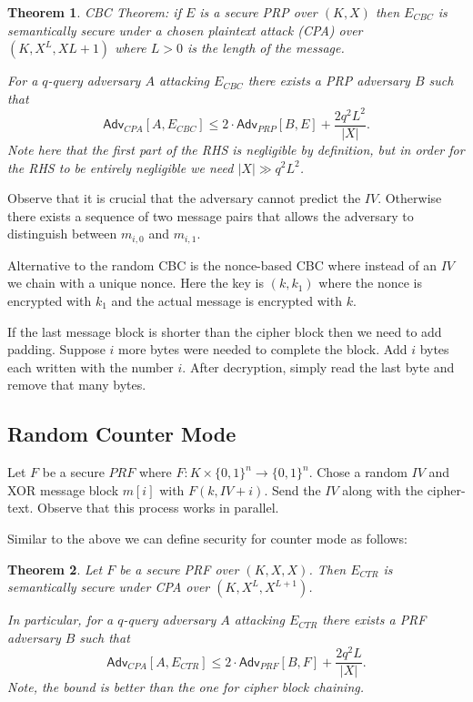 \documentclass[twoside]{article}
\newcounter{lecnum}
\newtheorem{theorem}{Theorem}[lecnum]
\def\Adv{\mathsf{Adv}}
\begin{document}
\begin{theorem}
CBC Theorem: if $E$ is a secure PRP over $(K, X)$ then $E_{CBC}$ is semantically secure under a chosen plaintext attack (CPA) over $(K, X^{L}, X{L+1})$ where $L > 0$ is the length of the message.

For a $q$-query adversary $A$ attacking $E_{CBC}$ there exists a PRP adversary $B$ such that 
\[\Adv_{CPA}[A, E_{CBC}] \leq 2 \cdot \Adv_{PRP}[B,E] + \frac{2q^2L^2}{|X|}.\]
Note here that the first part of the RHS is negligible by definition, but in order for the RHS to be entirely negligible we need $|X| \gg q^2L^2$. 
\end{theorem}

Observe that it is crucial that the adversary cannot predict the $IV$. Otherwise there exists a sequence of two message pairs that allows the adversary to distinguish between $m_{i,0}$ and $m_{i,1}$.

Alternative to the random CBC is the nonce-based CBC where instead of an $IV$ we chain with a unique nonce. Here the key is $(k, k_1)$ where the nonce is encrypted with $k_1$ and the actual message is encrypted with $k$.

If the last message block is shorter than the cipher block then we need to add padding. Suppose $i$ more bytes were needed to complete the block. Add $i$ bytes each written with the number $i$. After decryption, simply read the last byte and remove that many bytes.

\subsection{Random Counter Mode}
Let $F$ be a secure $PRF$ where $F: K \times \{0,1\}^n \rightarrow \{0,1\}^n$. Chose a random $IV$ and XOR message block $m[i]$ with $F(k, IV+i)$. Send the $IV$ along with the cipher-text. Observe that this process works in parallel.

Similar to the above we can define security for counter mode as follows:
\begin{theorem}
Let $F$ be a secure PRF over $(K, X, X)$. Then $E_{CTR}$ is semantically secure under CPA over $(K, X^L, X^{L+1})$. 

In particular, for a $q$-query adversary $A$ attacking $E_{CTR}$ there exists a PRF adversary $B$ such that 
\[\Adv_{CPA}[A, E_{CTR}] \leq 2\cdot \Adv_{PRF}[B, F] + \frac{2q^2L}{|X|}.\]
Note, the bound is better than the one for cipher block chaining.
\end{theorem}
\end{document}
